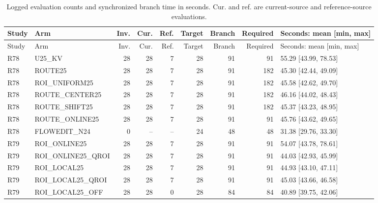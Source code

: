 \begingroup\scriptsize\setlength{\tabcolsep}{2pt}
\begin{longtable}{lp{.25\linewidth}rrrrrrp{.20\linewidth}}
\caption{Logged evaluation counts and synchronized branch time in seconds. Cur. and ref. are current-source and reference-source evaluations.}\\
\hline
Study & Arm & Inv. & Cur. & Ref. & Target & Branch & Required & Seconds: mean [min, max] \\ \hline
\endfirsthead
\hline
Study & Arm & Inv. & Cur. & Ref. & Target & Branch & Required & Seconds: mean [min, max] \\ \hline
\endhead
R78 & U25\_KV & 28 & 28 & 7 & 28 & 91 & 91 & 55.29 [43.99, 78.53] \\
R78 & ROUTE25 & 28 & 28 & 7 & 28 & 91 & 182 & 45.30 [42.44, 49.09] \\
R78 & ROI\_UNIFORM25 & 28 & 28 & 7 & 28 & 91 & 182 & 45.58 [42.62, 49.70] \\
R78 & ROUTE\_CENTER25 & 28 & 28 & 7 & 28 & 91 & 182 & 46.16 [44.02, 48.43] \\
R78 & ROUTE\_SHIFT25 & 28 & 28 & 7 & 28 & 91 & 182 & 45.37 [43.23, 48.95] \\
R78 & ROUTE\_ONLINE25 & 28 & 28 & 7 & 28 & 91 & 91 & 45.76 [43.62, 49.65] \\
R78 & FLOWEDIT\_N24 & 0 & -- & -- & 24 & 48 & 48 & 31.38 [29.76, 33.30] \\
R79 & ROI\_ONLINE25 & 28 & 28 & 7 & 28 & 91 & 91 & 54.07 [43.78, 78.61] \\
R79 & ROI\_ONLINE25\_QROI & 28 & 28 & 7 & 28 & 91 & 91 & 44.03 [42.93, 45.99] \\
R79 & ROI\_LOCAL25 & 28 & 28 & 7 & 28 & 91 & 91 & 44.93 [43.10, 47.11] \\
R79 & ROI\_LOCAL25\_QROI & 28 & 28 & 7 & 28 & 91 & 91 & 45.03 [43.66, 46.58] \\
R79 & ROI\_LOCAL25\_OFF & 28 & 28 & 0 & 28 & 84 & 84 & 40.89 [39.75, 42.06] \\
\hline\end{longtable}
\endgroup

